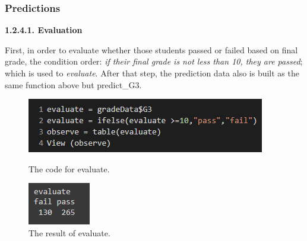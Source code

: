 \documentclass[a4paper]{article}
\begin{document}

\subsubsection{Predictions}
\vspace{0.4cm}
\textbf{1.2.4.1. Evaluation} \\ \newline
{}
First, in order to evaluate whether those students passed or failed based on
final grade, the condition order: \textit{if their final grade is not less than 10, they are passed}; which is used to \textit{evaluate}. After that step, the prediction data also is built as the same function above but predict\_G3.
\begin{figure}[H]
    \centering
    \begin{minipage}{0.5\textwidth}
        \centering
        \includegraphics[width = 1\linewidth]{Images/55.PNG}
        \caption{The code for evaluate.}
        \label{fig:prediction1}
    \end{minipage}%
    \begin{minipage}{0.5\textwidth}
        \centering
        \includegraphics[width = 0.34\linewidth]{Images/56.PNG}
        \caption{The result of evaluate.}
        \label{fig:prediction2}
    \end{minipage}
\end{figure}
\end{document}
